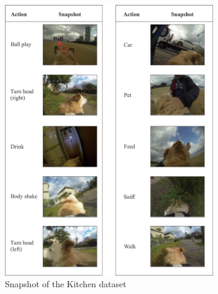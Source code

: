 \begin{figure}[!t]
\centering
\includegraphics[width=0.8\textwidth]{figures/appendix_a}
\caption{Snapshot of the Kitchen dataset} 
\label{fig:append3}
\end{figure}
